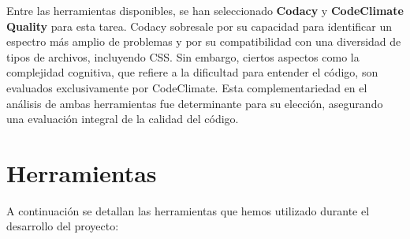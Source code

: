 Entre las herramientas disponibles, se han seleccionado \textbf{Codacy}\cite{Codacy} y \textbf{CodeClimate Quality}\cite{CodeClimate} para esta tarea. Codacy sobresale por su capacidad para identificar un espectro más amplio de problemas y por su compatibilidad con una diversidad de tipos de archivos, incluyendo CSS. Sin embargo, ciertos aspectos como la complejidad cognitiva, que refiere a la dificultad para entender el código, son evaluados exclusivamente por CodeClimate. Esta complementariedad en el análisis de ambas herramientas fue determinante para su elección, asegurando una evaluación integral de la calidad del código.


\section{Herramientas}
 A continuación se detallan las herramientas que hemos utilizado durante el desarrollo del proyecto:

